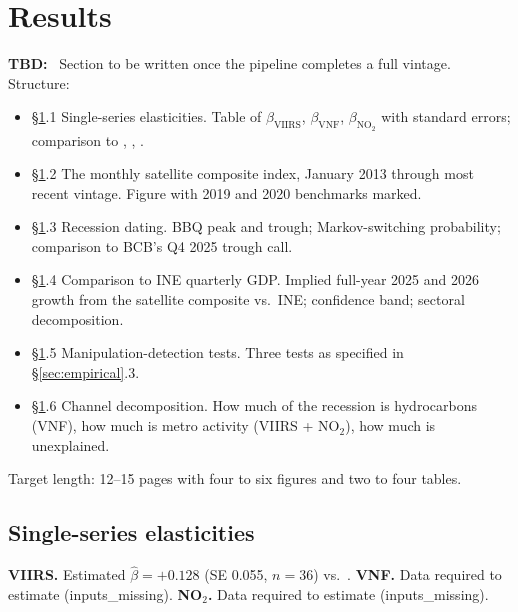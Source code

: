 \documentclass[11pt,letterpaper]{article}
\newenvironment{tbd}{\begin{tbdbox}\noindent\textbf{\color{yellow!60!black}TBD:}\ }{\end{tbdbox}}
\newcommand{\claim}[1]{\textbf{#1.}}
\begin{document}
\section{Results}
\label{sec:results}

\begin{tbd}
Section to be written once the pipeline completes a full vintage. Structure:
\begin{itemize}[nosep]
\item \S\ref{sec:results}.1 Single-series elasticities. Table of $\beta_{\text{VIIRS}}$, $\beta_{\text{VNF}}$, $\beta_{\text{NO}_2}$ with standard errors; comparison to \citet{hsw2012}, \citet{beyer_hu_yao2022}, \citet{do_etal2018}.
\item \S\ref{sec:results}.2 The monthly satellite composite index, January \num{2013} through most recent vintage. Figure with \num{2019} and \num{2020} benchmarks marked.
\item \S\ref{sec:results}.3 Recession dating. BBQ peak and trough; Markov-switching probability; comparison to BCB's Q4 \num{2025} trough call.
\item \S\ref{sec:results}.4 Comparison to INE quarterly GDP. Implied full-year \num{2025} and \num{2026} growth from the satellite composite vs.\ INE; confidence band; sectoral decomposition.
\item \S\ref{sec:results}.5 Manipulation-detection tests. Three tests as specified in \S\ref{sec:empirical}.3.
\item \S\ref{sec:results}.6 Channel decomposition. How much of the recession is hydrocarbons (VNF), how much is metro activity (VIIRS + NO$_2$), how much is unexplained.
\end{itemize}
Target length: \numrange{12}{15} pages with four to six figures and two to four tables.
\end{tbd}

\subsection{Single-series elasticities}
\label{subsec:elasticities}


\claim{VIIRS} Estimated $\hat\beta = +0.128$ (SE 0.055, $n=36$) vs.\ \citet{hsw2012}.
\claim{VNF} Data required to estimate (inputs_missing).
\claim{NO$_2$} Data required to estimate (inputs_missing).
\end{document}
